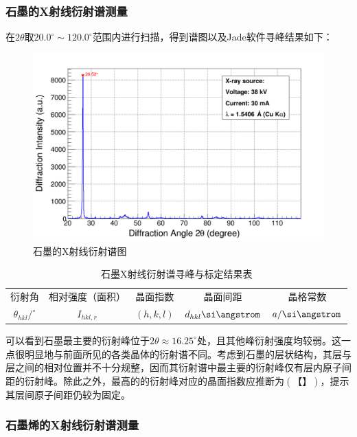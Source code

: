 \documentclass{thuemp}
\begin{document}
\subsubsection{石墨的X射线衍射谱测量}

在$2\theta$取$20.0^\circ \sim 120.0^\circ$范围内进行扫描，得到谱图以及Jade软件寻峰结果如下：

\begin{figure}[H]
    \centering
    \includegraphics[width=0.8\linewidth]{../Data/C-Graphite-multi.png}
    \caption{石墨的X射线衍射谱图}
    \label{fig:graphite_xrd}
\end{figure}

\begin{table}
    \centering
    \captionnamefont{\wuhao\bf\heiti}
    \captiontitlefont{\wuhao\bf\heiti}
    \caption{石墨X射线衍射谱寻峰与标定结果表}
    \label{tab:graphite_xrd}
    \liuhao
    \begin{tabular}{ccccc}
        \toprule
        衍射角 & 相对强度（面积）& 晶面指数 & 晶面间距 & 晶格常数 \\
        $\theta_{hkl}/^\circ$ & $I_{hkl,r}$ & $(h,k,l)$ & $d_{hkl}\text{\si\angstrom}$ & $a/\text{\si\angstrom}$\\
        \midrule
        \bottomrule
    \end{tabular}
\end{table}

可以看到石墨最主要的衍射峰位于$2\theta \approx 16.25^\circ$处，且其他峰衍射强度均较弱。这一点很明显地与前面所见的各类晶体的衍射谱不同。考虑到石墨的层状结构，其层与层之间的相对位置并不十分规整，因而其衍射谱中最主要的衍射峰仅有层内原子间距的衍射峰。除此之外，最高的的衍射峰对应的晶面指数应推断为$(【】)$，提示其层间原子间距仍较为固定。

\subsubsection{石墨烯的X射线衍射谱测量}
\end{document}
